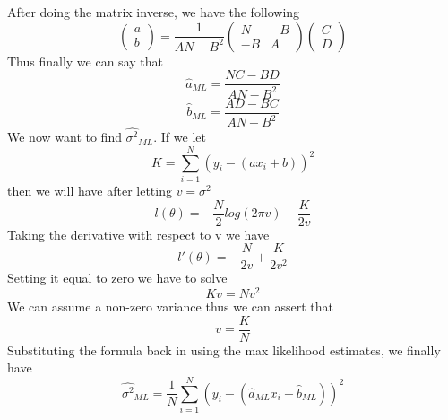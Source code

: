 \documentclass[11pt,psfig]{article}
\begin{document}
After doing the matrix inverse, we have the following 
\[ 
\left( \begin{array}{ccc}
a \\
b \end{array} \right) =
\frac{1}{AN - B^2}
\left( \begin{array}{ccc}
N & -B \\
-B & A \end{array} \right)
\left( \begin{array}{ccc}
C \\
D \end{array} \right)
\]
Thus finally we can say that
\[
\hat{a}_{ML} = \frac{NC-BD}{AN-B^2}
\]
\[
\hat{b}_{ML} = \frac{AD-BC}{AN-B^2}
\]
We now want to find $\hat{\sigma^2}_{ML}$. If we let
\[
K = \sum_{i=1}^N{(y_i - (ax_i + b))^2}
\]
then we will have after letting $v = \sigma^2$
\[
l(\theta) = -\frac{N}{2} log(2\pi v) - \frac{K}{2v}
\]
Taking the derivative with respect to v we have
\[
l'(\theta) = -\frac{N}{2v} + \frac{K}{2v^2}
\]
Setting it equal to zero we have to solve
\[
Kv = N v^2
\]
We can assume a non-zero variance thus we can assert that
\[
v = \frac{K}{N}
\]
Substituting the formula back in using the max likelihood estimates, we finally have
\[
\hat{\sigma^2}_{ML} = \frac{1}{N} \sum_{i=1}^N{(y_i - (\hat{a}_{ML}x_i + \hat{b}_{ML}))^2}
\]
\end{document}
